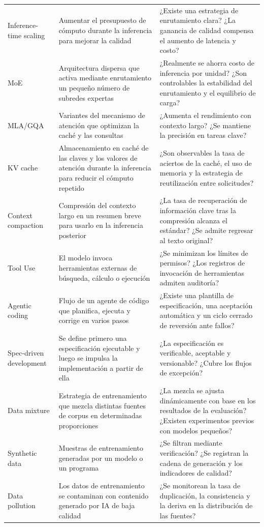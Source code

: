 \begin{longtable}{p{}p{}p{}}
Inference-time scaling & Aumentar el presupuesto de cómputo durante la inferencia para mejorar la calidad & ¿Existe una estrategia de enrutamiento clara? ¿La ganancia de calidad compensa el aumento de latencia y costo? \\
MoE & Arquitectura dispersa que activa mediante enrutamiento un pequeño número de subredes expertas & ¿Realmente se ahorra costo de inferencia por unidad? ¿Son controlables la estabilidad del enrutamiento y el equilibrio de carga? \\
MLA/GQA & Variantes del mecanismo de atención que optimizan la caché y las consultas & ¿Aumenta el rendimiento con contexto largo? ¿Se mantiene la precisión en tareas clave? \\
KV cache & Almacenamiento en caché de las claves y los valores de atención durante la inferencia para reducir el cómputo repetido & ¿Son observables la tasa de aciertos de la caché, el uso de memoria y la estrategia de reutilización entre solicitudes? \\
Context compaction & Compresión del contexto largo en un resumen breve para usarlo en la inferencia posterior & ¿La tasa de recuperación de información clave tras la compresión alcanza el estándar? ¿Se admite regresar al texto original? \\
Tool Use & El modelo invoca herramientas externas de búsqueda, cálculo o ejecución & ¿Se minimizan los límites de permisos? ¿Los registros de invocación de herramientas admiten auditoría? \\
Agentic coding & Flujo de un agente de código que planifica, ejecuta y corrige en varios pasos & ¿Existe una plantilla de especificación, una aceptación automática y un ciclo cerrado de reversión ante fallos? \\
Spec-driven development & Se define primero una especificación ejecutable y luego se impulsa la implementación a partir de ella & ¿La especificación es verificable, aceptable y versionable? ¿Cubre los flujos de excepción? \\
Data mixture & Estrategia de entrenamiento que mezcla distintas fuentes de corpus en determinadas proporciones & ¿La mezcla se ajusta dinámicamente con base en los resultados de la evaluación? ¿Existen experimentos previos con modelos pequeños? \\
Synthetic data & Muestras de entrenamiento generadas por un modelo o un programa & ¿Se filtran mediante verificación? ¿Se registran la cadena de generación y los indicadores de calidad? \\
Data pollution & Los datos de entrenamiento se contaminan con contenido generado por IA de baja calidad & ¿Se monitorean la tasa de duplicación, la consistencia y la deriva en la distribución de las fuentes? \\

\end{longtable}
